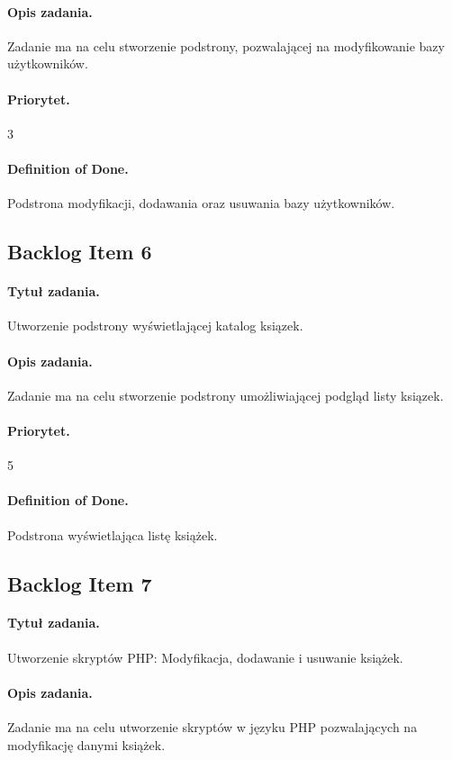 \documentclass[a4paper]{article}
\begin{document}
\paragraph{Opis zadania.} Zadanie ma na celu stworzenie podstrony, pozwalającej na modyfikowanie bazy użytkowników.
\paragraph{Priorytet.} 3
\paragraph{Definition of Done.} Podstrona modyfikacji, dodawania oraz usuwania bazy użytkowników.

\subsection{Backlog Item 6}
\paragraph{Tytuł zadania.} Utworzenie podstrony wyświetlającej katalog ksiązek.
\paragraph{Opis zadania.} Zadanie ma na celu stworzenie podstrony umożliwiającej podgląd listy ksiązek.
\paragraph{Priorytet.} 5
\paragraph{Definition of Done.} Podstrona wyświetlająca listę książek.

\subsection{Backlog Item 7} 
\paragraph{Tytuł zadania.} Utworzenie skryptów PHP: Modyfikacja, dodawanie i usuwanie książek.
\paragraph{Opis zadania.} Zadanie ma na celu utworzenie skryptów w języku PHP pozwalających na modyfikację danymi książek.
\end{document}
